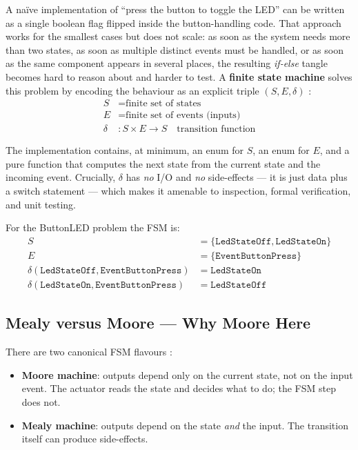 \documentclass[12pt]{article}
\begin{document}
A naïve implementation of \enquote{press the button to toggle the LED} can be written as a single boolean flag flipped inside the button-handling code. That approach works for the smallest cases but does not scale: as soon as the system needs more than two states, as soon as multiple distinct events must be handled, or as soon as the same component appears in several places, the resulting \emph{if-else} tangle becomes hard to reason about and harder to test. A \textbf{finite state machine} solves this problem by encoding the behaviour as an explicit triple $(S, E, \delta)$ \cite{wagner}:
\begin{align}
S &= \text{finite set of states} \\
E &= \text{finite set of events (inputs)} \\
\delta &: S \times E \to S \quad \text{transition function}
\end{align}

The implementation contains, at minimum, an enum for $S$, an enum for $E$, and a pure function that computes the next state from the current state and the incoming event. Crucially, $\delta$ has \emph{no} I/O and \emph{no} side-effects --- it is just data plus a switch statement --- which makes it amenable to inspection, formal verification, and unit testing.

For the ButtonLED problem the FSM is:
\begin{align}
S &= \{ \mathtt{LedStateOff}, \mathtt{LedStateOn} \} \\
E &= \{ \mathtt{EventButtonPress} \} \\
\delta(\mathtt{LedStateOff}, \mathtt{EventButtonPress}) &= \mathtt{LedStateOn} \\
\delta(\mathtt{LedStateOn},  \mathtt{EventButtonPress}) &= \mathtt{LedStateOff}
\end{align}

\subsection{Mealy versus Moore --- Why Moore Here}

There are two canonical FSM flavours \cite{wagner}:
\begin{itemize}
  \item \textbf{Moore machine}: outputs depend only on the current state, not on the input event. The actuator reads the state and decides what to do; the FSM step does not.
  \item \textbf{Mealy machine}: outputs depend on the state \emph{and} the input. The transition itself can produce side-effects.
\end{itemize}
\end{document}
